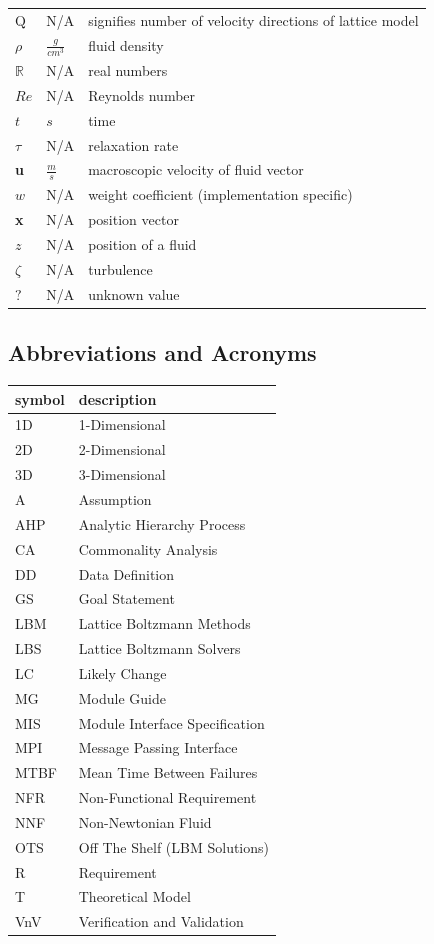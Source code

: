 \documentclass[12pt]{article}
\begin{document}
\begin{longtable*}{l l p{12cm}}
$\mathrm{Q}$ & N/A & signifies number of velocity directions of lattice model
\\
$\rho$ & $\frac{g}{cm^3}$ & fluid density
\\
$\mathbb{R}$ & N/A & real numbers
\\
$Re$ & N/A & Reynolds number
\\
$t$ & $s$ & time
\\
$\tau$ & N/A & relaxation rate
\\
\textbf{u} & $\frac{m}{s}$ & macroscopic velocity of fluid vector
\\
$w$ & N/A & weight coefficient (implementation specific)
\\
\textbf{x} & N/A & position vector
\\
$z$ & N/A & position of a fluid
\\
$\zeta$ & N/A & turbulence
\\
$?$ & N/A & unknown value 
\\
\bottomrule
\end{longtable*}

\subsection{Abbreviations and Acronyms}

\renewcommand{\arraystretch}{1.2}
\begin{tabular}{l l} 
  \toprule		
  \textbf{symbol} & \textbf{description}\\
  \midrule
  1D & 1-Dimensional\\ 
  2D & 2-Dimensional\\ 
  3D & 3-Dimensional\\ 
  A & Assumption\\
  AHP & Analytic Hierarchy Process\\
  CA & Commonality Analysis\\
  DD & Data Definition\\
  GS & Goal Statement\\
  LBM & Lattice Boltzmann Methods\\
  LBS & Lattice Boltzmann Solvers\\
  LC & Likely Change\\
  MG & Module Guide\\
  MIS & Module Interface Specification\\
  MPI & Message Passing Interface\\
  MTBF & Mean Time Between Failures\\
  NFR & Non-Functional Requirement\\
  NNF & Non-Newtonian Fluid\\
  OTS & Off The Shelf (LBM Solutions)\\
  R & Requirement\\
  T & Theoretical Model\\
  VnV & Verification and Validation\\
  \bottomrule
\end{tabular}\\
\end{document}

